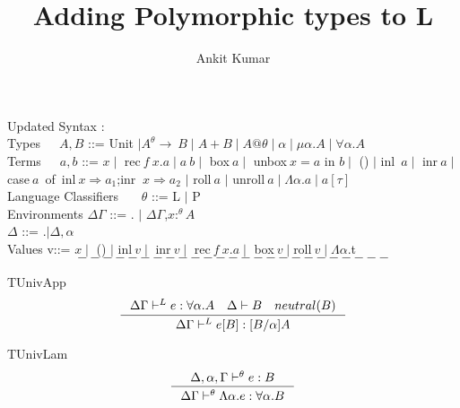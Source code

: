 \documentclass[12pt]{article}
\title{%
  Adding Polymorphic types to L\theta}
\author{Ankit Kumar}
\begin{document}
Updated Syntax :\\

Types\ \ \ $A,B$ ::= Unit $\mid A^{\theta} \rightarrow\ B \mid A+B
\mid A@\theta \mid \alpha \mid \mu \alpha.A \mid \forall \alpha.A$ \\

Terms\ \ \ $a,b$ ::= $x \mid$  rec$\ f\ x.a \mid a\ b \mid$ box$\ a \mid$
unbox$\ x=a$ in $b \mid$ () $\mid$ inl\ $a \mid$ inr$\ a \mid$ case$\ a$\ of\
{inl$\ x \Rightarrow a_1$;inr $\ x \Rightarrow a_2$} $\mid$ roll$\ a$
$\mid$ unroll$\ a \mid \Lambda \alpha.a \mid a[\tau]$  \\

Language Classifiers \ \ \  $\theta$ ::= L $\mid$ P \\

Environments $\Delta\Gamma$ ::= . $\mid $ $\Delta \Gamma$,$x:^{\theta}
A$\\

 \hspace{25 mm}           $ \Delta$   ::=  .$\mid \Delta,\alpha$\\

Values v::= $x \mid $ () $\mid $ inl$\ v \mid $ inr$\ v \mid $ rec$\
f\ x.a \mid $ box$\ v \mid $roll$\ v \mid \Lambda \alpha$.t\\
$$
-------------------------
$$

TUnivApp
$$
\inference{\Delta\Gamma \vdash^{L} e:\forall \alpha.A \quad \Delta \vdash
B \quad neutral(B)}{\Delta\Gamma \vdash^{L} e[B]:[B/\alpha]A}  
$$

TUnivLam
$$
\inference{\Delta,\alpha,\Gamma \vdash^{\theta} e:B}{\Delta\Gamma
  \vdash^{\theta} \Lambda \alpha.e:\forall \alpha.B}
$$
\end{document}
